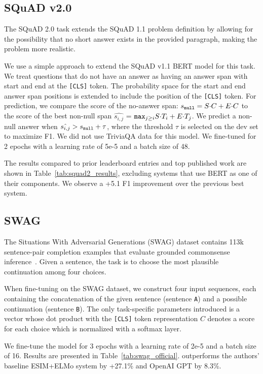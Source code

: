 \subsection{SQuAD v2.0}

The SQuAD 2.0 task extends the SQuAD 1.1 problem definition by allowing for the possibility that no short answer exists in the provided paragraph, making the problem more realistic.

We use a simple approach to extend the SQuAD v1.1 BERT model for this task. We treat questions that do not have an answer as having an answer span with start and end at the {\tt [CLS]} token. The probability space for the start and end answer span positions is extended to include the position of the {\tt [CLS]} token. For prediction, we compare the score of the no-answer span: $s_{\tt null} = S{\cdot}C + E{\cdot}C$ to the score of the best non-null span $\hat{s_{i,j}}$ =  $ {\tt max}_{j \geq i} S{\cdot}T_i + E{\cdot}T_j$. We predict a non-null answer when  $\hat{s_{i,j}} > s_{\tt null} + \tau $, where the threshold $\tau$ is selected on the dev set to maximize F1. We did not use TriviaQA data for this model. We fine-tuned for 2 epochs with a learning rate of 5e-5 and a batch size of 48.

The results compared to prior leaderboard entries and top published work \cite{unet,slqa} are shown in Table~\ref{tab:squad2_results}, excluding systems that use BERT as one of their components. We observe a +5.1 F1 improvement over the previous best system.


\subsection{SWAG}
\label{sec:swag}
The Situations With Adversarial Generations (SWAG) dataset contains 113k sentence-pair completion examples that evaluate grounded commonsense inference~\cite{zellers2018swag}. Given a sentence, the task is to choose the most plausible continuation among four choices.


When fine-tuning on the SWAG dataset, we construct four input sequences, each containing the concatenation of the given sentence (sentence {\tt A}) and a possible continuation (sentence {\tt B}). The only task-specific parameters introduced is a vector whose dot product with the {\tt [CLS]} token representation $C$ denotes a score for each choice which is normalized with a softmax layer.

We fine-tune the model for 3 epochs with a learning rate of 2e-5 and a batch size of 16. Results are presented in Table~\ref{tab:swag_official}. \bertlarge outperforms the authors' baseline ESIM+ELMo system by +27.1\% and OpenAI GPT by 8.3\%.


